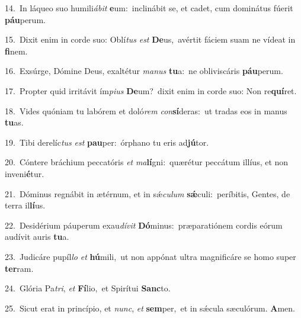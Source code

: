 {\numbfont\textcolor{\numbcolor}{14.}}~In láqueo suo humili\-\textit{á}\-\textit{bit} \textbf{e}\-um:~\star inclinábit se, et cadet, cum dominátus fúerit \textbf{páu}\-perum.\par
{\numbfont\textcolor{\numbcolor}{15.}}~Dixit enim in corde suo: Oblí\textit{tus} \textit{est} \textbf{De}\-us,~\star avértit fáciem suam ne vídeat in \textbf{fi}\-nem.\par
{\numbfont\textcolor{\numbcolor}{16.}}~Exsúrge, Dómine Deus, exaltétur \textit{ma}\-\textit{nus} \textbf{tu}\-a:~\star ne obliviscáris \textbf{páu}\-perum.\par
{\numbfont\textcolor{\numbcolor}{17.}}~Propter quid irritávit ím\-\textit{pi}\-\textit{us} \textbf{De}\-um?~\star dixit enim in corde suo: Non re\-\textbf{quí}\-ret.\par
{\numbfont\textcolor{\numbcolor}{18.}}~Vides quóniam tu labórem et doló\textit{rem} \textit{con}\-\textbf{sí}deras:~\star ut tradas eos in manus \textbf{tu}\-as.\par
{\numbfont\textcolor{\numbcolor}{19.}}~Tibi derelíc\textit{tus} \textit{est} \textbf{pau}\-per:~\star órphano tu eris ad\-\textbf{jú}\-tor.\par
{\numbfont\textcolor{\numbcolor}{20.}}~Cóntere bráchium peccatóris \textit{et} \textit{ma}\-\textbf{lí}gni:~\star quærétur peccátum illíus, et non inveni\-\textbf{é}\-tur.\par
{\numbfont\textcolor{\numbcolor}{21.}}~Dóminus regnábit in ætérnum, et in sǽ\-\textit{cu}\-\textit{lum} \textbf{sǽ}\-culi:~\star períbitis, Gentes, de terra il\-\textbf{lí}\-us.\par
{\numbfont\textcolor{\numbcolor}{22.}}~Desidérium páuperum exau\-\textit{dí}\-\textit{vit} \textbf{Dó}\-minus:~\star præparatiónem cordis eórum audívit auris \textbf{tu}\-a.\par
{\numbfont\textcolor{\numbcolor}{23.}}~Judicáre pupíl\textit{lo} \textit{et} \textbf{hú}\-mili,~\star ut non appónat ultra magnificáre se homo super \textbf{ter}\-ram.\par
{\numbfont\textcolor{\numbcolor}{24.}}~Glória Pa\-\textit{tri}\-, \textit{et} \textbf{Fí}\-lio,~\star et Spirítui \textbf{Sanc}\-to.\par
{\numbfont\textcolor{\numbcolor}{25.}}~Sicut erat in princípio, et \textit{nunc}\-, \textit{et} \textbf{sem}\-per,~\star et in sǽcula sæculórum. \textbf{A}\-men.\par
